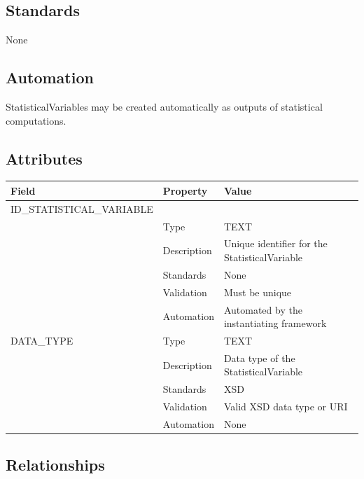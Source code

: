 \subsection{Standards}\label{standards-32}

None

\subsection{Automation}\label{automation-32}

StatisticalVariables may be created automatically as outputs of
statistical computations.

\subsection{Attributes}\label{attributes-27}

\begin{longtable}[]{@{}lll@{}}
\toprule\noalign{}
Field & Property & Value \\
\midrule\noalign{}
\endhead
\bottomrule\noalign{}
\endlastfoot
ID\_STATISTICAL\_VARIABLE & & \\
& Type & TEXT \\
& Description & Unique identifier for the StatisticalVariable \\
& Standards & None \\
& Validation & Must be unique \\
& Automation & Automated by the instantiating framework \\
DATA\_TYPE & Type & TEXT \\
& Description & Data type of the StatisticalVariable \\
& Standards & XSD \\
& Validation & Valid XSD data type or URI \\
& Automation & None \\
\end{longtable}

\subsection{Relationships}\label{relationships-26}

